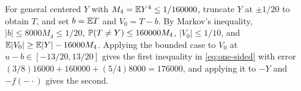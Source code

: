 For general centered $Y$ with $M_4=\mathbb E Y^4\le1/160000$, truncate $Y$ at
$\pm1/20$ to obtain $T$, and set $b=\mathbb E T$ and $V_0=T-b$. By Markov's
inequality, $|b|\le8000M_4\le1/20$, $\mathbb P(T\ne Y)\le160000M_4$,
$|V_0|\le1/10$, and $\mathbb E|V_0|\ge\mathbb E|Y|-16000M_4$. Applying the bounded case to
$V_0$ at $u-b\in[-13/20,13/20]$ gives the first inequality in
\eqref{eq:one-sided} with error $(3/8)16000+160000+(5/4)8000=176000$, and
applying it to $-Y$ and $-f(-\cdot)$ gives the second.

